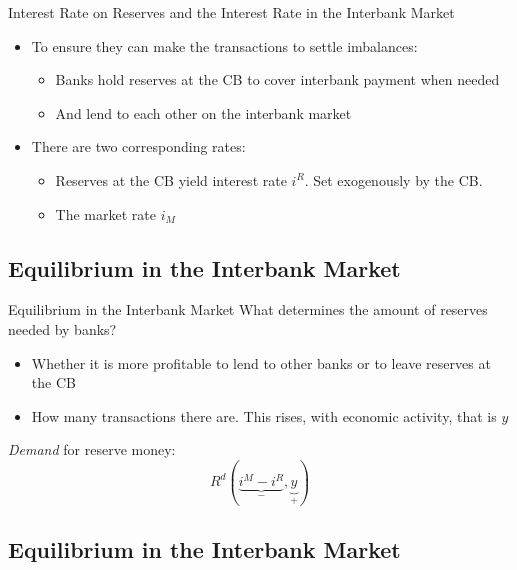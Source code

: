 \documentclass[
  ignorenonframetext,
  aspectratio=169,
]{beamer}
\providecommand{\tightlist}{%
  \setlength{\itemsep}{0pt}\setlength{\parskip}{0pt}}\usepackage{longtable,booktabs,array}
\begin{document}
\begin{frame}{Interest Rate on Reserves and the Interest Rate in the
Interbank Market}
\begin{itemize}
\item
  To ensure they can make the transactions to settle imbalances:

  \begin{itemize}
  \tightlist
  \item
    Banks hold reserves at the CB to cover interbank payment when needed
  \item
    And lend to each other on the interbank market
  \end{itemize}
\item
  There are two corresponding rates:

  \begin{itemize}
  \tightlist
  \item
    Reserves at the CB yield interest rate \(i^R\). Set exogenously by
    the CB.
  \item
    The market rate \(i_M\)
  \end{itemize}
\end{itemize}
\end{frame}

\subsection{Equilibrium in the Interbank
Market}\label{equilibrium-in-the-interbank-market}

\begin{frame}{Equilibrium in the Interbank Market}
What determines the amount of reserves needed by banks?

\begin{itemize}
\tightlist
\item
  Whether it is more profitable to lend to other banks or to leave
  reserves at the CB
\item
  How many transactions there are. This rises, with economic activity,
  that is \(y\)
\end{itemize}

\emph{Demand} for reserve money:
\[R^d \left( \underbrace{i^M-i^R}_{-} , \underbrace{y}_{+}\right)\]
\end{frame}

\subsection{Equilibrium in the Interbank
Market}\label{equilibrium-in-the-interbank-market-1}
\end{document}
